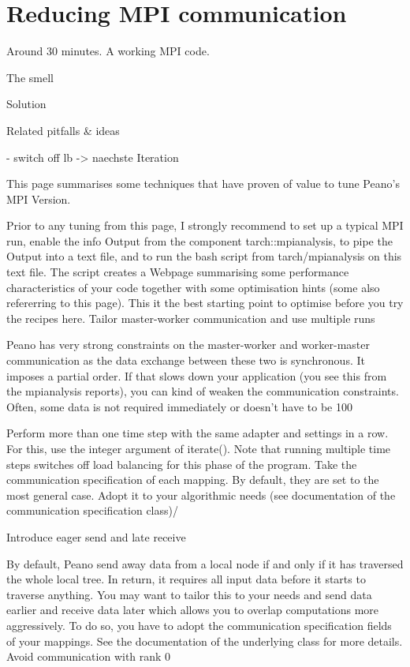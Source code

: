 \section{Reducing MPI communication}


\chapterDescription
  {
    Around 30 minutes.
  }
  {
    A working MPI code.
  }

  
  The smell
  
  Solution
  
  Related pitfalls \& ideas
  
  - switch off lb -> naechste Iteration
  
  
  
This page summarises some techniques that have proven of value to tune Peano's MPI Version.

Prior to any tuning from this page, I strongly recommend to set up a typical MPI run, enable the info Output from the component tarch::mpianalysis, to pipe the Output into a text file, and to run the bash script from tarch/mpianalysis on this text file. The script creates a Webpage summarising some performance characteristics of your code together with some optimisation hints (some also refererring to this page). This it the best starting point to optimise before you try the recipes here.
Tailor master-worker communication and use multiple runs

Peano has very strong constraints on the master-worker and worker-master communication as the data exchange between these two is synchronous. It imposes a partial order. If that slows down your application (you see this from the mpianalysis reports), you can kind of weaken the communication constraints. Often, some data is not required immediately or doesn't have to be 100%

    Perform more than one time step with the same adapter and settings in a row. For this, use the integer argument of iterate(). Note that running multiple time steps switches off load balancing for this phase of the program.
    Take the communication specification of each mapping. By default, they are set to the most general case. Adopt it to your algorithmic needs (see documentation of the communication specification class)/

Introduce eager send and late receive

By default, Peano send away data from a local node if and only if it has traversed the whole local tree. In return, it requires all input data before it starts to traverse anything. You may want to tailor this to your needs and send data earlier and receive data later which allows you to overlap computations more aggressively. To do so, you have to adopt the communication specification fields of your mappings. See the documentation of the underlying class for more details.
Avoid communication with rank 0

